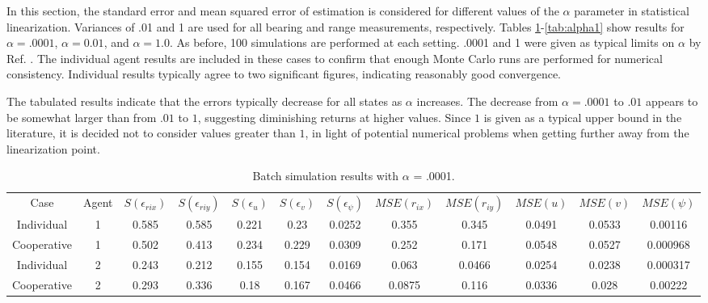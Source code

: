 \documentclass{aiaa-tc}
\begin{document}
In this section, the standard error and mean squared error of estimation is considered for different values of the $\alpha$ parameter in statistical linearization. Variances of .01 and 1 are used for all bearing and range measurements, respectively. Tables \ref{tab:alpha1e-4}-\ref{tab:alpha1} show results for $\alpha = .0001$, $\alpha=0.01$, and $\alpha = 1.0$. As before, 100 simulations are performed at each setting. .0001 and 1 were given as typical limits on $\alpha$ by Ref. . The individual agent results are included in these cases to confirm that enough Monte Carlo runs are performed for numerical consistency. Individual results typically agree to two significant figures, indicating reasonably good convergence.

The tabulated results indicate that the errors typically decrease for all states as $\alpha$ increases. The decrease from $\alpha = .0001$ to $.01$ appears to be somewhat larger than from $.01$ to $1$, suggesting diminishing returns at higher values. Since $1$ is given as a typical upper bound in the literature, it is decided not to consider values greater than $1$, in light of potential numerical problems when getting further away from the linearization point.

\begin{table}[tb!]
\scriptsize
\centering
\begin{tabular}{c|c|c|c|c|c|c|c|c|c|c|c|}
Case & Agent & $S(\epsilon_{rix})$ & $S(\epsilon_{riy})$ & $S(\epsilon_{u})$ & $S(\epsilon_{v})$ & $S(\epsilon_{\psi})$ & $MSE(r_{ix})$ & $MSE(r_{iy})$ & $MSE(u)$ & $MSE(v)$ & $MSE(\psi)$ \\
Individual & 1& 0.585& 0.585& 0.221& 0.23& 0.0252& 0.355& 0.345& 0.0491& 0.0533& 0.00116 \\
Cooperative & 1& 0.502& 0.413& 0.234& 0.229& 0.0309& 0.252& 0.171& 0.0548& 0.0527& 0.000968 \\
Individual & 2& 0.243& 0.212& 0.155& 0.154& 0.0169& 0.063& 0.0466& 0.0254& 0.0238& 0.000317 \\
Cooperative & 2& 0.293& 0.336& 0.18& 0.167& 0.0466& 0.0875& 0.116& 0.0336& 0.028& 0.00222 \\
\end{tabular}
\caption{Batch simulation results with $\alpha$ = .0001.}
\label{tab:alpha1e-4}
\end{table}
\end{document}
